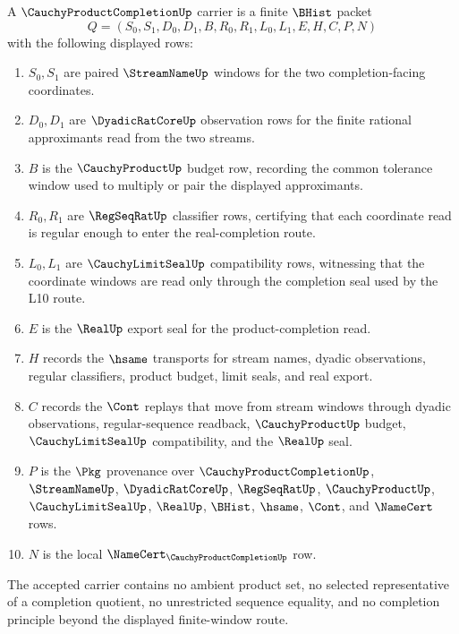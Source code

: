 \begin{definition}
\label{def:cauchy-product-completion-carrier}
A $\CauchyProductCompletionUp$ carrier is a finite $\BHist$ packet
$$
Q=(S_0,S_1,D_0,D_1,B,R_0,R_1,L_0,L_1,E,H,C,P,N)
$$
with the following displayed rows:
\begin{enumerate}
\item $S_0,S_1$ are paired $\StreamNameUp$ windows for the two completion-facing coordinates.
\item $D_0,D_1$ are $\DyadicRatCoreUp$ observation rows for the finite rational approximants read from the two streams.
\item $B$ is the $\CauchyProductUp$ budget row, recording the common tolerance window used to multiply or pair the displayed approximants.
\item $R_0,R_1$ are $\RegSeqRatUp$ classifier rows, certifying that each coordinate read is regular enough to enter the real-completion route.
\item $L_0,L_1$ are $\CauchyLimitSealUp$ compatibility rows, witnessing that the coordinate windows are read only through the completion seal used by the L10 route.
\item $E$ is the $\RealUp$ export seal for the product-completion read.
\item $H$ records the $\hsame$ transports for stream names, dyadic observations, regular classifiers, product budget, limit seals, and real export.
\item $C$ records the $\Cont$ replays that move from stream windows through dyadic observations, regular-sequence readback, $\CauchyProductUp$ budget, $\CauchyLimitSealUp$ compatibility, and the $\RealUp$ seal.
\item $P$ is the $\Pkg$ provenance over $\CauchyProductCompletionUp$, $\StreamNameUp$, $\DyadicRatCoreUp$, $\RegSeqRatUp$, $\CauchyProductUp$, $\CauchyLimitSealUp$, $\RealUp$, $\BHist$, $\hsame$, $\Cont$, and $\NameCert$ rows.
\item $N$ is the local $\NameCert_{\CauchyProductCompletionUp}$ row.
\end{enumerate}
The accepted carrier contains no ambient product set, no selected representative of a completion quotient, no unrestricted sequence equality, and no completion principle beyond the displayed finite-window route.
\end{definition}

